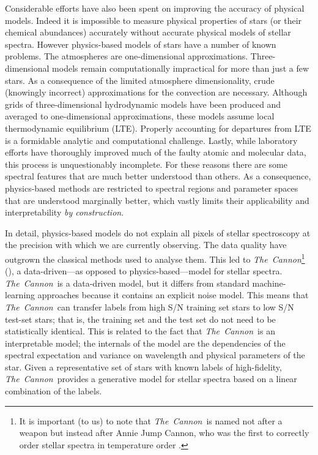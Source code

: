 \documentclass[12pt,preprint]{aastex}
\newcommand{\project}[1]{\textsl{#1}}
\newcommand{\TheCannon}{\project{The~Cannon}}
\begin{document}
Considerable efforts have also been spent on improving the accuracy of physical
models.  Indeed it is impossible to measure physical properties of stars (or 
their chemical abundances) accurately without accurate physical models of 
stellar spectra.  However physics-based models of stars have a number of known
problems.  The atmospheres are one-dimensional approximations.  
Three-dimensional models remain computationally impractical for more than just a
few stars.  As a consequence of the limited atmosphere dimensionality, crude 
(knowingly incorrect) approximations for the convection are 
necessary.  Although grids of three-dimensional hydrodynamic models have been 
produced and averaged to one-dimensional approximations, these models assume 
local thermodynamic equilibrium (LTE).  Properly accounting for departures from 
LTE is a formidable analytic and computational challenge.  Lastly, while 
laboratory efforts have thoroughly improved much of the faulty atomic and 
molecular data, this process is unquestionably incomplete.  For these reasons 
there are some spectral features that are much better understood than others.  
As a consequence, physics-based methods are restricted to spectral regions and
parameter spaces that are understood marginally better, which vastly limits 
their applicability and interpretability \emph{by construction}.


In detail, physics-based models do not explain all pixels of stellar 
spectroscopy at the precision with which we are currently observing.  The data
quality have outgrown the classical methods used to analyse them.  This led to 
\TheCannon\footnote{It is important (to us) to note that \TheCannon\ is named 
not after a weapon but instead after Annie Jump Cannon, who was the first to 
correctly order stellar spectra in temperature order \citep[and who did
so by looking at the data, and without any use of physics-based models, see][]
{Cannon_1912}.} (\citealt{tc}), a data-driven---as opposed to 
physics-based---model for stellar spectra.  \TheCannon\ is a data-driven model, 
but it differs from standard machine-learning approaches because it contains an 
explicit noise model.  This means that \TheCannon\ can transfer labels from high
S/N training set stars to low S/N test-set stars; that is, the training set and
the test set do not need to be statistically identical.  This is related to the
fact that \TheCannon\ is an interpretable model; the internals of the model are 
the dependencies of the spectral expectation and variance on wavelength and 
physical parameters of the star.  Given a representative set of stars with known
labels of high-fidelity, \TheCannon\ provides a generative model for stellar 
spectra based on a linear combination of the labels.  
\end{document}
